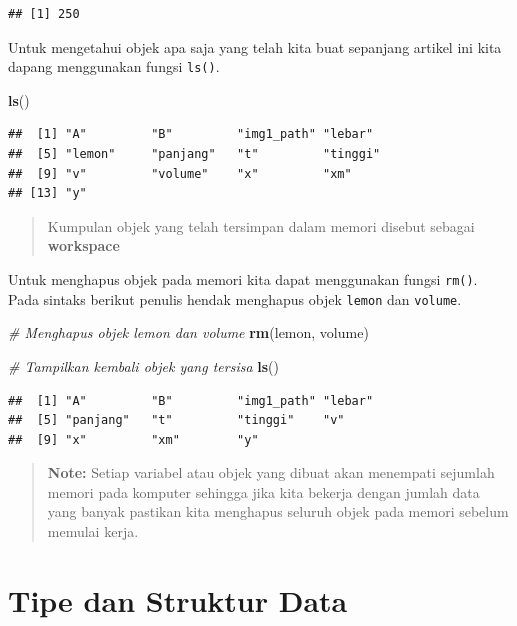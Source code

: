 \documentclass[]{book}
\newenvironment{Shaded}{\begin{snugshade}}{\end{snugshade}}
\newcommand{\KeywordTok}[1]{\textcolor[rgb]{0.13,0.29,0.53}{\textbf{#1}}}
\newcommand{\CommentTok}[1]{\textcolor[rgb]{0.56,0.35,0.01}{\textit{#1}}}
\newcommand{\NormalTok}[1]{#1}
\begin{document}
\begin{verbatim}
## [1] 250
\end{verbatim}

Untuk mengetahui objek apa saja yang telah kita buat sepanjang artikel
ini kita dapang menggunakan fungsi \texttt{ls()}.

\begin{Shaded}
\begin{Highlighting}[]
\KeywordTok{ls}\NormalTok{()}
\end{Highlighting}
\end{Shaded}

\begin{verbatim}
##  [1] "A"         "B"         "img1_path" "lebar"    
##  [5] "lemon"     "panjang"   "t"         "tinggi"   
##  [9] "v"         "volume"    "x"         "xm"       
## [13] "y"
\end{verbatim}

\begin{quote}
Kumpulan objek yang telah tersimpan dalam memori disebut sebagai
\textbf{workspace}
\end{quote}

Untuk menghapus objek pada memori kita dapat menggunakan fungsi
\texttt{rm()}. Pada sintaks berikut penulis hendak menghapus objek
\texttt{lemon} dan \texttt{volume}.

\begin{Shaded}
\begin{Highlighting}[]
\CommentTok{# Menghapus objek lemon dan volume}
\KeywordTok{rm}\NormalTok{(lemon, volume)}

\CommentTok{# Tampilkan kembali objek yang tersisa}
\KeywordTok{ls}\NormalTok{()}
\end{Highlighting}
\end{Shaded}

\begin{verbatim}
##  [1] "A"         "B"         "img1_path" "lebar"    
##  [5] "panjang"   "t"         "tinggi"    "v"        
##  [9] "x"         "xm"        "y"
\end{verbatim}

\begin{quote}
\textbf{Note: } Setiap variabel atau objek yang dibuat akan menempati
sejumlah memori pada komputer sehingga jika kita bekerja dengan jumlah
data yang banyak pastikan kita menghapus seluruh objek pada memori
sebelum memulai kerja.
\end{quote}

\section{Tipe dan Struktur Data}\label{tipe-dan-struktur-data}
\end{document}
